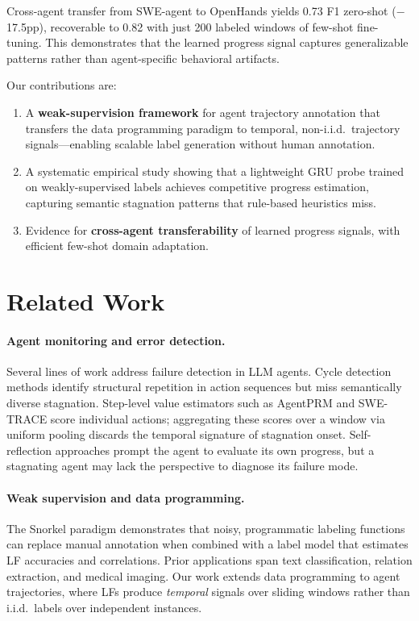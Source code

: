 \documentclass[11pt]{article}
\begin{document}
Cross-agent transfer from SWE-agent to OpenHands yields 0.73 F1 zero-shot ($-$17.5pp), recoverable to 0.82 with just 200 labeled windows of few-shot fine-tuning. This demonstrates that the learned progress signal captures generalizable patterns rather than agent-specific behavioral artifacts.

Our contributions are:
\begin{enumerate}
\item A \textbf{weak-supervision framework} for agent trajectory annotation that transfers the data programming paradigm to temporal, non-i.i.d.\ trajectory signals---enabling scalable label generation without human annotation.
\item A systematic empirical study showing that a lightweight GRU probe trained on weakly-supervised labels achieves competitive progress estimation, capturing semantic stagnation patterns that rule-based heuristics miss.
\item Evidence for \textbf{cross-agent transferability} of learned progress signals, with efficient few-shot domain adaptation.
\end{enumerate}

\section{Related Work}
\label{sec:related}

\paragraph{Agent monitoring and error detection.}
Several lines of work address failure detection in LLM agents. Cycle detection methods identify structural repetition in action sequences but miss semantically diverse stagnation. Step-level value estimators such as AgentPRM and SWE-TRACE score individual actions; aggregating these scores over a window via uniform pooling discards the temporal signature of stagnation onset. Self-reflection approaches prompt the agent to evaluate its own progress, but a stagnating agent may lack the perspective to diagnose its failure mode.

\paragraph{Weak supervision and data programming.}
The Snorkel paradigm demonstrates that noisy, programmatic labeling functions can replace manual annotation when combined with a label model that estimates LF accuracies and correlations. Prior applications span text classification, relation extraction, and medical imaging. Our work extends data programming to agent trajectories, where LFs produce \emph{temporal} signals over sliding windows rather than i.i.d.\ labels over independent instances.
\end{document}
